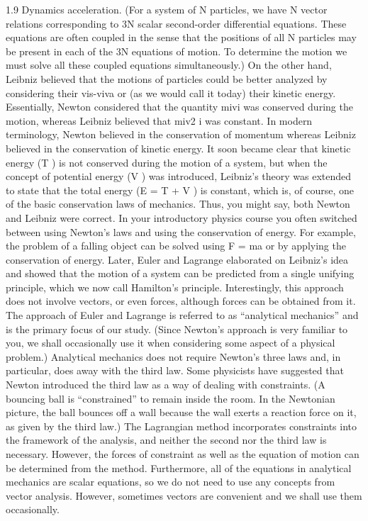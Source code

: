 1.9
Dynamics
acceleration. (For a system of N particles, we have N vector relations corresponding to 3N scalar second-order differential equations. These equations are
often coupled in the sense that the positions of all N particles may be present
in each of the 3N equations of motion. To determine the motion we must solve
all these coupled equations simultaneously.)
On the other hand, Leibniz believed that the motions of particles could be
better analyzed by considering their vis-viva or (as we would call it today) their
kinetic energy.
Essentially, Newton considered that the quantity mivi was conserved during the motion, whereas Leibniz believed that miv2
i was constant. In modern terminology, Newton believed in the conservation of momentum whereas
Leibniz believed in the conservation of kinetic energy. It soon became clear
that kinetic energy (T ) is not conserved during the motion of a system, but
when the concept of potential energy (V ) was introduced, Leibniz's theory
was extended to state that the total energy (E = T + V ) is constant, which is,
of course, one of the basic conservation laws of mechanics. Thus, you might
say, both Newton and Leibniz were correct.
In your introductory physics course you often switched between using Newton's laws and using the conservation of energy. For example, the problem of
a falling object can be solved using F = ma or by applying the conservation
of energy.
Later, Euler and Lagrange elaborated on Leibniz's idea and showed that the
motion of a system can be predicted from a single unifying principle, which
we now call Hamilton's principle. Interestingly, this approach does not involve
vectors, or even forces, although forces can be obtained from it. The approach
of Euler and Lagrange is referred to as ``analytical mechanics'' and is the primary focus of our study. (Since Newton's approach is very familiar to you, we
shall occasionally use it when considering some aspect of a physical problem.)
Analytical mechanics does not require Newton's three laws and, in particular,
does away with the third law. Some physicists have suggested that Newton
introduced the third law as a way of dealing with constraints. (A bouncing ball
is ``constrained'' to remain inside the room. In the Newtonian picture, the ball
bounces off a wall because the wall exerts a reaction force on it, as given by the
third law.) The Lagrangian method incorporates constraints into the framework
of the analysis, and neither the second nor the third law is necessary. However,
the forces of constraint as well as the equation of motion can be determined
from the method. Furthermore, all of the equations in analytical mechanics
are scalar equations, so we do not need to use any concepts from vector
analysis. However, sometimes vectors are convenient and we shall use them
occasionally.

